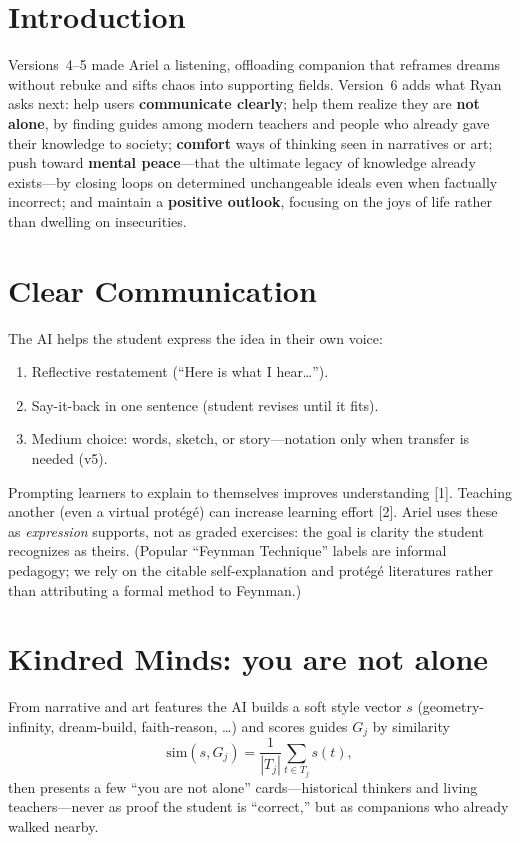 \documentclass[11pt, a4paper]{article}
\begin{document}
\section{Introduction}
Versions~4--5 made Ariel a listening, offloading companion that reframes dreams without rebuke and sifts chaos into supporting fields. Version~6 adds what Ryan asks next: help users \textbf{communicate clearly}; help them realize they are \textbf{not alone}, by finding guides among modern teachers and people who already gave their knowledge to society; \textbf{comfort} ways of thinking seen in narratives or art; push toward \textbf{mental peace}---that the ultimate legacy of knowledge already exists---by closing loops on determined unchangeable ideals even when factually incorrect; and maintain a \textbf{positive outlook}, focusing on the joys of life rather than dwelling on insecurities.

\section{Clear Communication}
The AI helps the student express the idea in their own voice:
\begin{enumerate}[leftmargin=1.3em]
  \item Reflective restatement (``Here is what I hear\ldots'').
  \item Say-it-back in one sentence (student revises until it fits).
  \item Medium choice: words, sketch, or story---notation only when transfer is needed (v5).
\end{enumerate}
Prompting learners to explain to themselves improves understanding [1]. Teaching another (even a virtual prot\'{e}g\'{e}) can increase learning effort [2]. Ariel uses these as \emph{expression} supports, not as graded exercises: the goal is clarity the student recognizes as theirs. (Popular ``Feynman Technique'' labels are informal pedagogy; we rely on the citable self-explanation and prot\'{e}g\'{e} literatures rather than attributing a formal method to Feynman.)

\section{Kindred Minds: you are not alone}
From narrative and art features the AI builds a soft style vector $s$ (geometry-infinity, dream-build, faith-reason, \ldots) and scores guides $G_j$ by similarity
\begin{equation}
\mathrm{sim}(s,G_j)=\frac{1}{|T_j|}\sum_{t\in T_j} s(t),
\end{equation}
then presents a few ``you are not alone'' cards---historical thinkers and living teachers---never as proof the student is ``correct,'' but as companions who already walked nearby.
\end{document}
